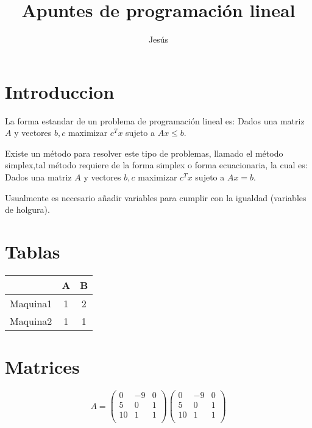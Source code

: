 \documentclass{article}
\title{Apuntes de programación lineal}
\author{Jesús}
\begin{document}
\maketitle
\section{Introduccion}
La forma estandar de un problema de programación lineal es:
Dados una matriz $A$ y vectores
$b,c$ maximizar $c^Tx$ sujeto a $Ax\leq b$.

\medskip
Existe un método para resolver este tipo de problemas, llamado el
método simplex,tal método requiere de la forma simplex o forma
ecuacionaria, la cual es:
Dados una matriz $A$ y vectores $b,c$ maximizar $c^Tx$ sujeto a $Ax =
b$.

\medskip
Usualmente es necesario añadir variables para cumplir con la igualdad
(variables de holgura).
\section{Tablas}
\begin{tabular}{|c|c|c|}
  \hline
  &A&B\\
  \hline
  Maquina1&1&2\\
  \hline
  Maquina2&1&1\\
  \hline   
\end{tabular}
\section{Matrices}
\begin{equation}
  \label{eq:1}
  A=
  \begin{pmatrix} 
    0&-9&0\\
    5&0&1\\
    10&1&1\\
  \end{pmatrix}
  \begin{pmatrix}
     0&-9&0\\
    5&0&1\\
    10&1&1\\
  \end{pmatrix}
\end{equation}
\end{document}
